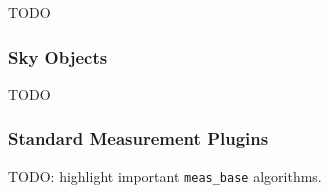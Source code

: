 TODO

\subsubsection{Sky Objects}

\label{sec:sky-objects}

TODO

\subsubsection{Standard Measurement Plugins}

TODO: highlight important \texttt{meas\_base} algorithms.









